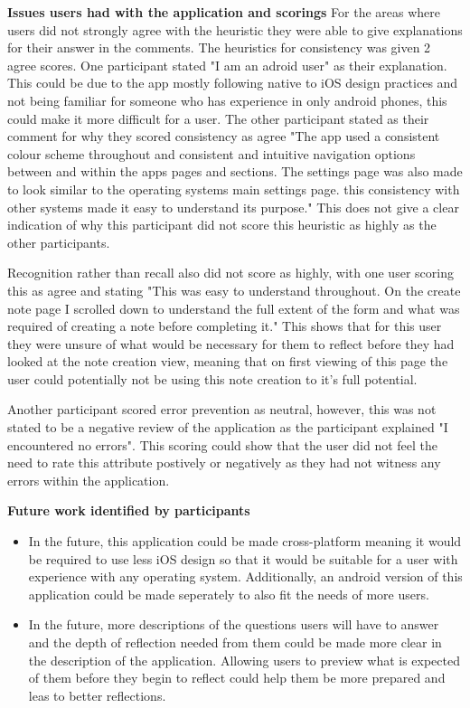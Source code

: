 \documentclass{l4proj}
\begin{document}
\textbf{Issues users had with the application and scorings} For the areas where users did not strongly agree with the heuristic they were
able to give explanations for their answer in the comments. The heuristics for consistency was given 2 agree scores. One
participant stated "I am an adroid user" as their explanation. This could be due to the app mostly following native to iOS design
practices and not being familiar for someone who has experience in only android phones, this could make it more difficult for a user.
The other participant stated as their comment for why they scored consistency as agree "The app used a consistent colour scheme 
throughout and consistent and intuitive navigation options between and within the apps pages and sections. The settings page was 
also made to look similar to the operating systems main settings page. this consistency with other systems made it easy to understand 
its purpose." This does not give a clear indication of why this participant did not score this heuristic as highly as the other 
participants.
\par 
Recognition rather than recall also did not score as highly, with one user scoring this as agree and stating "This was easy to 
understand throughout. On the create note page I scrolled down to understand the full extent of the form and what was required 
of creating a note before completing it." This shows that for this user they were unsure of what would be necessary for them to
reflect before they had looked at the note creation view, meaning that on first viewing of this page the user could potentially 
not be using this note creation to it's full potential. 
\par 
Another participant scored error prevention as neutral, however, this was not stated to be a negative review of the application
as the participant explained "I encountered no errors". This scoring could show that the user did not feel the need to rate this
attribute postively or negatively as they had not witness any errors within the application. 
\par 
\textbf{Future work identified by participants}
\begin{itemize}
    \item In the future, this application could be made cross-platform meaning it would be required to use less iOS design so that 
    it would be suitable for a user with experience with any operating system. Additionally, an android version of this application
    could be made seperately to also fit the needs of more users. 
    \item In the future, more descriptions of the questions users will have to answer and the depth of reflection needed from them 
    could be made more clear in the description of the application. Allowing users to preview what is expected of them before they 
    begin to reflect could help them be more prepared and leas to better reflections.
\end{itemize}
\end{document}
